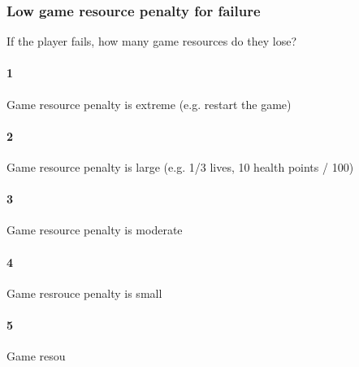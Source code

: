 \subsubsection{Low game resource penalty for failure}If the player fails, how many game resources do they lose?\paragraph{1}Game resource penalty is extreme (e.g. restart the game)\paragraph{2}Game resource penalty is large (e.g. 1/3 lives, 10 health points / 100)\paragraph{3}Game resource penalty is moderate\paragraph{4}Game resrouce penalty is small\paragraph{5}Game resou